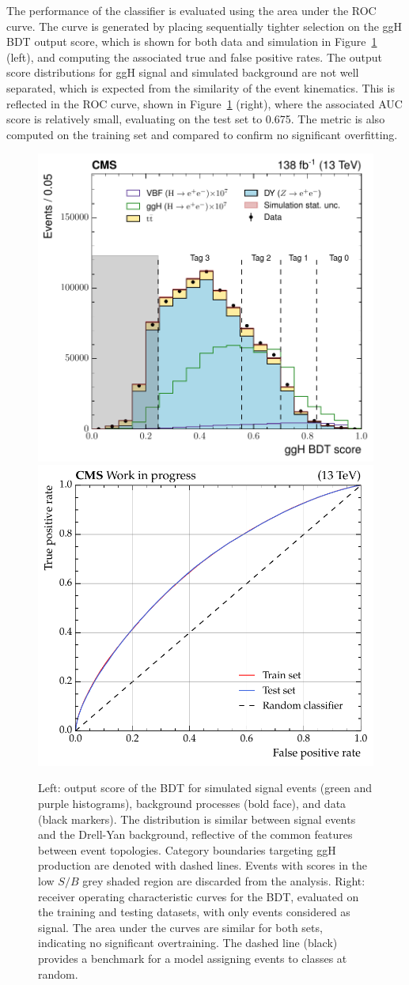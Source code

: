 The performance of the classifier is evaluated using the area under the ROC curve. The curve is generated by placing sequentially tighter selection on the ggH BDT output score, which is shown for both data and simulation in Figure~\ref{fig:hee_ggh_out_score_and_rocs} (left), and computing the associated true and false positive rates.
The output score distributions for ggH signal and simulated background are not well separated, which is expected from the similarity of the event kinematics.
This is reflected in the ROC curve, shown in Figure~\ref{fig:hee_ggh_out_score_and_rocs} (right), where the associated AUC score is relatively small, evaluating on the test set to 0.675.
The metric is also computed on the training set and compared to confirm no significant overfitting. %

\begin{figure}[htbp!]
\centering
\includegraphics[width =0.47\linewidth]{Figures/Hee/ggH/dataMC/ggH_BDT_pt_reweighted_output_score_paper.pdf}\hfill%
\includegraphics[width =0.48\linewidth]{Figures/Hee/ggH/dataMC/ggH_BDT_pt_reweighted_ROC_curve.pdf}\hfill%
\caption[The output score distribution of the \ggH BDT and associated ROC curve.]{Left: output score of the \ggH BDT for simulated signal events (green and purple histograms), background processes (bold face), and data (black markers). The distribution is similar between \ggH signal events and the Drell-Yan background, reflective of the common features between event topologies. Category boundaries targeting ggH production are denoted with dashed lines. Events with scores in the low $S/B$ grey shaded region are discarded from the analysis. Right: receiver operating characteristic curves for the \ggH BDT, evaluated on the training and testing datasets, with only \ggH events considered as signal. The area under the curves are similar for both sets, indicating no significant overtraining. The dashed line (black) provides a benchmark for a model assigning events to classes at random.}
\label{fig:hee_ggh_out_score_and_rocs}
\end{figure}

